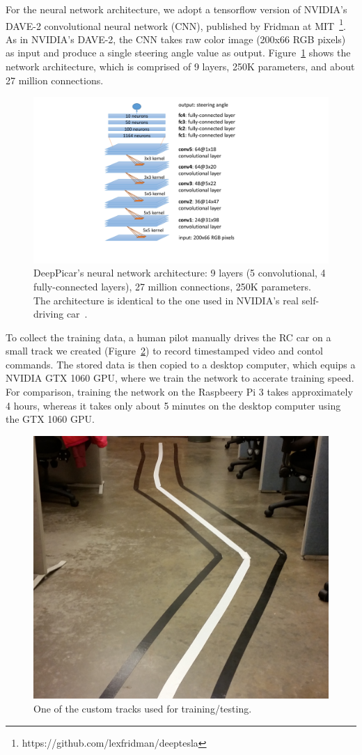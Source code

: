 For the neural network architecture, we adopt a tensorflow version of
NVIDIA's DAVE-2 convolutional neural network (CNN), published by
Fridman at  MIT~\footnote{https://github.com/lexfridman/deeptesla}. As
in NVIDIA's DAVE-2, the CNN takes raw color image (200x66 RGB pixels)
as input and produce a single steering angle value as
output. Figure~\ref{fig:architecture} shows the network architecture, which
is comprised of 9 layers, 250K parameters, and about 27 million
connections.

\begin{figure}[h]
  \centering
  \includegraphics[width=.4\textwidth]{figs/architecture}
  \caption{DeepPicar's neural network architecture: 9 layers (5
    convolutional, 4 fully-connected layers), 27 million connections,
    250K parameters. The architecture is identical to the one used
    in NVIDIA's real self-driving car~\cite{Bojarski2016}.}
  \label{fig:architecture}
\end{figure}

To collect the training data, a human pilot manually drives the RC car
on a small track we created (Figure~\ref{fig:track}) to record
timestamped video and contol commands. The stored data is then copied 
to a desktop computer, which equips a NVIDIA GTX 1060 GPU, where we
train the network to accerate training speed. 
For comparison, training the network on the Raspbeery Pi 3 takes
approximately 4 hours, whereas it takes only about 5 minutes on the
desktop computer using the GTX 1060 GPU.

\begin{figure}[h]
  \centering
  \includegraphics[width=.4\textwidth]{figs/track_new2}
  \caption{One of the custom tracks used for training/testing.}
  \label{fig:track}
\end{figure}


